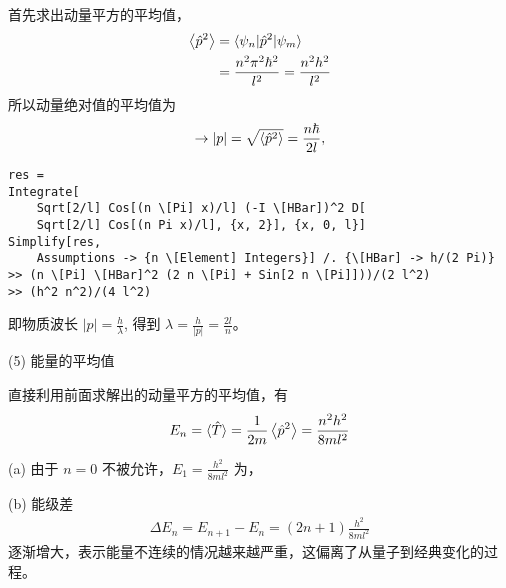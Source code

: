 首先求出动量平方的平均值，
\begin{align}
    \ev{\hat p^2} &= \langle \psi_n | \hat p^2 | \psi_m \rangle \\
    &= \frac{n^2\pi^2\hbar^2}{l^2} = \frac{n^2h^2}{l^2}
\end{align}
所以动量绝对值的平均值为
\begin{align}
    \rightarrow |p| = \sqrt{\ev{\hat p^2}} = \frac{n\hbar}{2l},
\end{align}
\begin{lstlisting}
res = 
Integrate[
    Sqrt[2/l] Cos[(n \[Pi] x)/l] (-I \[HBar])^2 D[
    Sqrt[2/l] Cos[(n Pi x)/l], {x, 2}], {x, 0, l}]
Simplify[res, 
    Assumptions -> {n \[Element] Integers}] /. {\[HBar] -> h/(2 Pi)}
>> (n \[Pi] \[HBar]^2 (2 n \[Pi] + Sin[2 n \[Pi]]))/(2 l^2)
>> (h^2 n^2)/(4 l^2)
\end{lstlisting}
即物质波长 $|p| = \frac{h}{\lambda}$, 得到 $\lambda = \frac h{|p|} = \frac{2l}n$。 


(5) 能量的平均值

直接利用前面求解出的动量平方的平均值，有
\begin{align}
    E_n = \langle \hat T \rangle = \frac1{2m} \ev{\hat p^2} = 
    \frac{n^2h^2}{8ml^2}
\end{align}

(a) 由于 $n=0$ 不被允许，$E_1 = \frac{h^2}{8ml^2}$ 为，

(b) 能级差
\begin{align}
    \Delta E_n = E_{n+1} - E_n = (2n+1) \frac{h^2}{8ml^2}
\end{align}
逐渐增大，表示能量不连续的情况越来越严重，这偏离了从量子到经典变化的过程。


